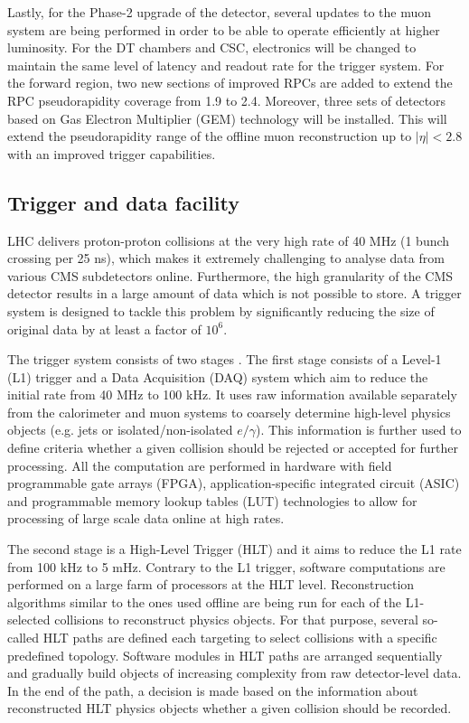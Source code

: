Lastly, for the Phase-2 upgrade of the detector, several updates to the muon system are being performed \cite{Hebbeker:2017bix} in order to be able to operate efficiently at higher luminosity. For the DT chambers and CSC, electronics will be changed to maintain the same level of latency and readout rate for the trigger system. For the forward region, two new sections of improved RPCs are added to extend the RPC pseudorapidity coverage from 1.9 to 2.4. Moreover, three sets of detectors based on Gas Electron Multiplier (GEM) technology will be installed. This will extend the pseudorapidity range of the offline muon reconstruction up to $|\eta| < 2.8$ with an improved trigger capabilities.

\subsection{Trigger and data facility}\label{sec:trigger}
LHC delivers proton-proton collisions at the very high rate of 40 MHz (1 bunch crossing per 25 ns), which makes it extremely challenging to analyse data  from various CMS subdetectors online. Furthermore, the high granularity of the CMS detector results in a large amount of data which is not possible to store. A trigger system is designed to tackle this problem by significantly reducing the size of original data by at least a factor of $10^6$.

The trigger system consists of two stages \cite{CMS:2016ngn}. The first stage consists of a Level-1 (L1) trigger and a Data Acquisition (DAQ) system which aim to reduce the initial rate from 40 MHz to 100 kHz. It uses raw information available separately from the calorimeter and muon systems to coarsely determine high-level physics objects (e.g. jets or isolated/non-isolated $e/\gamma$). This information is further used to define criteria whether a given collision should be rejected or accepted for further processing. All the computation are performed in hardware with field programmable gate arrays (FPGA), application-specific integrated circuit (ASIC) and programmable memory lookup tables (LUT) technologies to allow for processing of large scale data online at high rates.

The second stage is a High-Level Trigger (HLT) and it aims to reduce the L1 rate from 100 kHz to 5 mHz. Contrary to the L1 trigger, software computations are performed on a large farm of processors at the HLT level. Reconstruction algorithms similar to the ones used offline are being run for each of the L1-selected collisions to reconstruct physics objects. For that purpose, several so-called HLT paths are defined each targeting to select collisions with a specific predefined topology. Software modules in HLT paths are arranged sequentially and gradually build objects of increasing complexity from raw detector-level data. In the end of the path, a decision is made based on the information about reconstructed HLT physics objects whether a given collision should be recorded.

